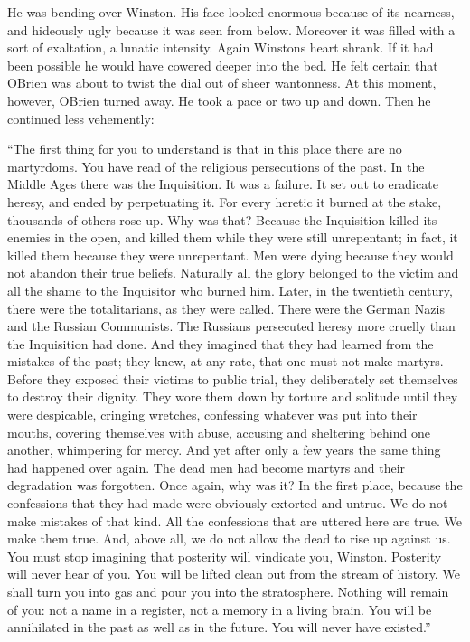 He was bending over Winston. His face looked enormous because of its
nearness, and hideously ugly because it was seen from below. Moreover it
was filled with a sort of exaltation, a lunatic intensity. Again
Winston\textquotesingle s heart shrank. If it had been possible he would
have cowered deeper into the bed. He felt certain that
O\textquotesingle Brien was about to twist the dial out of sheer
wantonness. At this moment, however, O\textquotesingle Brien turned
away. He took a pace or two up and down. Then he continued less
vehemently:

``The first thing for you to understand is that in this place there are
no martyrdoms. You have read of the religious persecutions of the past.
In the Middle Ages there was the Inquisition. It was a failure. It set
out to eradicate heresy, and ended by perpetuating it. For every heretic
it burned at the stake, thousands of others rose up. Why was that?
Because the Inquisition killed its enemies in the open, and killed them
while they were still unrepentant; in fact, it killed them because they
were unrepentant. Men were dying because they would not abandon their
true beliefs. Naturally all the glory belonged to the victim and all the
shame to the Inquisitor who burned him. Later, in the twentieth century,
there were the totalitarians, as they were called. There were the German
Nazis and the Russian Communists. The Russians persecuted heresy more
cruelly than the Inquisition had done. And they imagined that they had
learned from the mistakes of the past; they knew, at any rate, that one
must not make martyrs. Before they exposed their victims to public
trial, they deliberately set themselves to destroy their dignity. They
wore them down by torture and solitude until they were despicable,
cringing wretches, confessing whatever was put into their mouths,
covering themselves with abuse, accusing and sheltering behind one
another, whimpering for mercy. And yet after only a few years the same
thing had happened over again. The dead men had become martyrs and their
degradation was forgotten. Once again, why was it? In the first place,
because the confessions that they had made were obviously extorted and
untrue. We do not make mistakes of that kind. All the confessions that
are uttered here are true. We make them true. And, above all, we do not
allow the dead to rise up against us. You must stop imagining that
posterity will vindicate you, Winston. Posterity will never hear of you.
You will be lifted clean out from the stream of history. We shall turn
you into gas and pour you into the stratosphere. Nothing will remain of
you: not a name in a register, not a memory in a living brain. You will
be annihilated in the past as well as in the future. You will never have
existed.''


